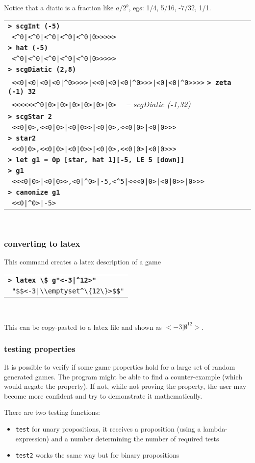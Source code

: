 \documentclass[a4paper,12pt]{article}
\newcommand{\bash}[1]{\small\textbf{\lstinline§> #1§}\\}
\newcommand{\out}[1]{\small\lstinline§ #1§}
\newcommand{\hsklcmt}[1]{~~-- \footnotesize\textit{#1}}
\newcommand{\haskellCode}{\fontfamily{pcr}\selectfont}
\newenvironment{sgcode}
	{ \haskellCode
	  \begin{tabular}{|p{0.9\textwidth}|}
      \hline	
	}
	{ \\\hline  
      \end{tabular} \\
	  \par 
	}
\begin{document}
Notice that a diatic is a fraction like $a/2^b$, egs: 1/4, 5/16, -7/32, 1/1.

\begin{sgcode}
\bash{scgInt (-5)}
\out{<^0|<^0|<^0|<^0|<^0|0>>>>>} \\
\bash{hat (-5)}
\out{<^0|<^0|<^0|<^0|<^0|0>>>>>} \\
\bash{scgDiatic (2,8)}
\out{<<0|<0|<0|<0|^0>>>>|<<0|<0|<0|^0>>>|<0|<0|^0>>>>}
\bash{zeta (-1) 32}
\out{<<<<<<^0|0>|0>|0>|0>|0>|0>} \hsklcmt{scgDiatic (-1,32)} \\
\bash{scgStar 2}
\out{<<0|0>,<<0|0>|<0|0>>|<0|0>,<<0|0>|<0|0>>>} \\
\bash{star2}
\out{<<0|0>,<<0|0>|<0|0>>|<0|0>,<<0|0>|<0|0>>>} \\
\bash{let g1 = Op [star, hat 1][-5, LE 5 [down]]}
\bash{g1}
\out{<<<0|0>|<0|0>>,<0|^0>|-5,<^5|<<<0|0>|<0|0>>|0>>>} \\
\bash{canonize g1}
\out{<<0|^0>|-5>}
\end{sgcode}

\subsubsection{converting to latex}

This command creates a latex description of a game

\begin{sgcode}
\bash{latex \$ g"<-3|^12>"}
\out{"$$<-3|\\emptyset^\{12\}>$$"}
\end{sgcode}

This can be copy-pasted to a latex file and shown as $<-3|\emptyset^{12}>$.

\subsubsection{testing properties}

It is possible to verify if some game properties hold for a large set of
random generated games. The program might be able to find a counter-example
(which would negate the property). If not, while not proving the property,
the user may become more confident and try to demonstrate it mathematically.

There are two testing functions:

\begin{itemize} \setlength\itemsep{0.1em}
  \item \verb|test| for unary propositions, it receives a proposition (using a lambda-expression) 
  and a number determining the number of required tests
  \item \verb|test2| works the same way but for binary propositions
\end{itemize}
\end{document}
